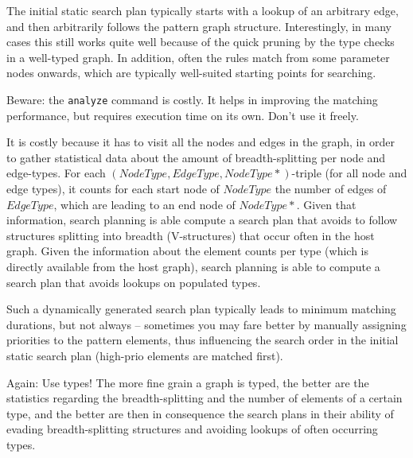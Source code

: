 The initial static search plan typically starts with a lookup of an arbitrary edge, and then arbitrarily follows the pattern graph structure.
Interestingly, in many cases this still works quite well because of the quick pruning by the type checks in a well-typed graph.
In addition, often the rules match from some parameter nodes onwards, which are typically well-suited starting points for searching.

Beware: the \texttt{analyze} command is costly.
It helps in improving the matching performance, but requires execution time on its own.
Don't use it freely.

It is costly because it has to visit all the nodes and edges in the graph,
in order to gather statistical data about the amount of breadth-splitting per node and edge-types. 
For each $(NodeType, EdgeType, NodeType\ast)$-triple (for all node and edge types), it counts for each start node of $NodeType$ the number of edges of $EdgeType$, which are leading to an end node of $NodeType\ast$.
Given that information, search planning is able compute a search plan that avoids to follow structures splitting into breadth (V-structures) that occur often in the host graph.
Given the information about the element counts per type (which is directly available from the host graph), 
search planning is able to compute a search plan that avoids lookups on populated types.

Such a dynamically generated search plan typically leads to minimum matching durations, but not always -- sometimes you may fare better by manually assigning priorities to the pattern elements, thus influencing the search order in the initial static search plan (high-prio elements are matched first).

Again: Use types!
The more fine grain a graph is typed, the better are the statistics regarding the breadth-splitting and the number of elements of a certain type, and the better are then in consequence the search plans in their ability of evading breadth-splitting structures and avoiding lookups of often occurring types.

